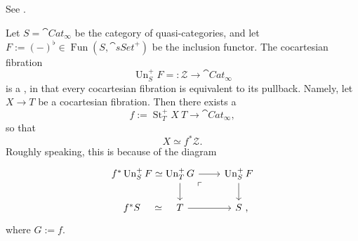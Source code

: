 See \cite[Theorem~3.2.0.1]{htt}.

\begin{example}
    Let $S=\cat{Cat}_\infty$ be the category of quasi-categories,
    and let $F:=(-)^\flat\in\operatorname{Fun}(S,\cat{sSet}^+)$
    be the inclusion functor.
    The cocartesian fibration 
    \[ \operatorname{Un}_S^+F=:\mathscr Z\to\cat{Cat}_\infty \]
    is a , in that every cocartesian fibration 
    is equivalent to its pullback.
    Namely, let $X\to T$ be a cocartesian fibration.
    Then there exists a 
    \[ f:=\operatorname{St}_T^+X\:T\to\cat{Cat}_\infty, \]
    so that 
    \[ X\simeq f^*\mathscr Z. \]
    Roughly speaking, this is because of the diagram 
    \[ \begin{tikzcd}[column sep=.5em]
        f^*\operatorname{Un}_S^+F \ar[r,phantom,"\simeq"] &
        \operatorname{Un}_T^+G \ar[rr]\ar[d]\ar[drr,phantom,very near start,"\ulcorner"] & \ &
        \operatorname{Un}_S^+F\ar[d] \\
        f^*S \ar[r,phantom,"\simeq"] & T\ar[rr] && S\rlap{\ ,}
    \end{tikzcd} \]
    where $G:=f$. \varqed
\end{example}
